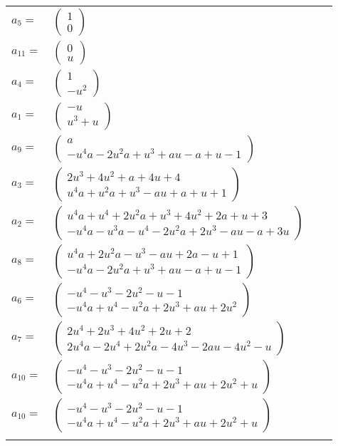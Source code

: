 \documentclass[1p]{elsarticle_modified}
\theoremstyle{definition}
\begin{document}
\begin{tabular}{m{7pt} m{180pt} m{7pt} m{180pt} }
\flushright $a_{5}=$&$\begin{pmatrix}1\\0\end{pmatrix}$ \\
\flushright $a_{11}=$&$\begin{pmatrix}0\\u\end{pmatrix}$ \\
\flushright $a_{4}=$&$\begin{pmatrix}1\\- u^2\end{pmatrix}$ \\
\flushright $a_{1}=$&$\begin{pmatrix}- u\\u^3+u\end{pmatrix}$ \\
\flushright $a_{9}=$&$\begin{pmatrix}a\\- u^4 a-2 u^2 a+u^3+a u- a+u-1\end{pmatrix}$ \\
\flushright $a_{3}=$&$\begin{pmatrix}2 u^3+4 u^2+a+4 u+4\\u^4 a+u^2 a+u^3- a u+a+u+1\end{pmatrix}$ \\
\flushright $a_{2}=$&$\begin{pmatrix}u^4 a+u^4+2 u^2 a+u^3+4 u^2+2 a+u+3\\- u^4 a- u^3 a- u^4-2 u^2 a+2 u^3- a u- a+3 u\end{pmatrix}$ \\
\flushright $a_{8}=$&$\begin{pmatrix}u^4 a+2 u^2 a- u^3- a u+2 a- u+1\\- u^4 a-2 u^2 a+u^3+a u- a+u-1\end{pmatrix}$ \\
\flushright $a_{6}=$&$\begin{pmatrix}- u^4- u^3-2 u^2- u-1\\- u^4 a+u^4- u^2 a+2 u^3+a u+2 u^2\end{pmatrix}$ \\
\flushright $a_{7}=$&$\begin{pmatrix}2 u^4+2 u^3+4 u^2+2 u+2\\2 u^4 a-2 u^4+2 u^2 a-4 u^3-2 a u-4 u^2- u\end{pmatrix}$ \\
\flushright $a_{10}=$&$\begin{pmatrix}- u^4- u^3-2 u^2- u-1\\- u^4 a+u^4- u^2 a+2 u^3+a u+2 u^2+u\end{pmatrix}$\\ \flushright $a_{10}=$&$\begin{pmatrix}- u^4- u^3-2 u^2- u-1\\- u^4 a+u^4- u^2 a+2 u^3+a u+2 u^2+u\end{pmatrix}$\\&\end{tabular}
\end{document}
